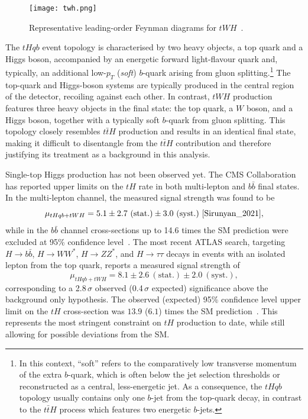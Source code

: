 \begin{figure}[htbp]
  \centering
  \texttt{[image: twh.png]}
  \caption{Representative leading-order Feynman diagrams for $tWH$~\cite{twh}.}
  \label{fig:feynman_tWH}
\end{figure}

  
The $tHqb$ event topology is characterised by two heavy objects, a top quark and a Higgs boson, accompanied by an energetic forward light-flavour quark and, typically, an additional low-$p_{T}$ (\textit{soft}) $b$-quark arising from gluon splitting.\footnote{In this context, ``soft'' refers to the comparatively low transverse momentum of the extra $b$-quark, which is often below the jet selection thresholds or reconstructed as a central, less-energetic jet. As a consequence, the $tHqb$ topology usually contains only one $b$-jet from the top-quark decay, in contrast to the $t\bar{t}H$ process which features two energetic $b$-jets.}
  The top-quark and Higgs-boson systems are typically produced in the central region of the detector, recoiling against each other. 
  In contrast, $tWH$ production features three heavy objects in the final state: the top quark, a $W$ boson, and a Higgs boson, together with a typically soft $b$-quark from gluon splitting. 
  This topology closely resembles $t\bar{t}H$ production and results in an identical final state, making it difficult to disentangle from the $t\bar{t}H$ contribution and therefore justifying its treatment as a background in this analysis. 
  
  Single-top Higgs production has not been observed yet.
  The CMS Collaboration has reported upper limits on the $tH$ rate in both multi-lepton and $b\bar{b}$ final states. 
  In the multi-lepton channel, the measured signal strength was found to be 
  \[
  \mu_{tHqb+tWH} = 5.1 \pm 2.7~(\text{stat.}) \pm 3.0~(\text{syst.})~\cite{Sirunyan_2021},
  \] 
  while in the $b\bar{b}$ channel cross-sections up to 14.6 times the SM prediction were excluded at 95\% confidence level~\cite{2025}. 
  The most recent ATLAS search, targeting $H\to b\bar{b}$, $H\to WW^*$, $H\to ZZ^*$, and $H\to\tau\tau$ decays in events with an isolated lepton from the top quark, reports a measured signal strength of
  \[
  \mu_{tHqb+tWH} = 8.1 \pm 2.6~(\text{stat.}) \pm 2.0~(\text{syst.}),
  \] 
  corresponding to a 2.8\,$\sigma$ observed (0.4\,$\sigma$ expected) significance above the background only hypothesis. 
  The observed (expected) 95\% confidence level upper limit on the $tH$ cross-section was $13.9$ ($6.1$) times the SM prediction~\cite{ATLAS:2025irr}. 
  This represents the most stringent constraint on $tH$ production to date, while still allowing for possible deviations from the SM.  
  
